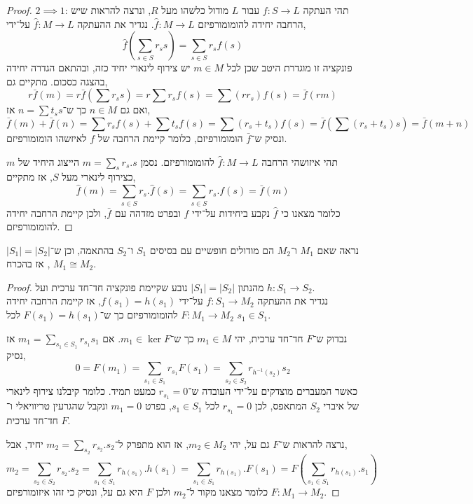 \begin{proof}
	$2 \implies 1$:
	תהי העתקה $f : S \to L$ עבור $L$ מודול כלשהו מעל $R$, ונרצה להראות שיש הרחבה יחידה להומומורפיזם $\hat{f} : M \to L$.
	נגדיר את ההעתקה $\hat{f} : M \to L$ על־ידי,
	\[
		\hat{f}(\sum_{s \in S} r_s s)
		= \sum_{s \in S} r_s f(s)
	\]
	פונקציה זו מוגדרת היטב שכן לכל $m \in M$ יש צירוף לינארי יחיד כזה, ובהתאם הגדרה יחידה בהצגה כסכום.
	מתקיים גם,
	\[
		r \bar{f}(m)
		= r \bar{f}(\sum r_s s)
		= r \sum r_s f(s)
		= \sum (r r_s) f(s)
		= \bar{f}(r m)
	\]
	ואם גם $n \in M$ כך ש־$n = \sum t_s s$ אז,
	\[
		\bar{f}(m) + \bar{f}(n)
		= \sum r_s f(s) + \sum t_s f(s)
		= \sum (r_s + t_s) f(s)
		= \bar{f}(\sum (r_s + t_s) s)
		= \bar{f}(m + n)
	\]
	ונסיק ש־$\bar{f}$ הומומורפיזם, כלומר קיימת הרחבה של $f$ לאיזשהו הומומורפיזם.

	תהי איזושהי הרחבה $\hat{f} : M \to L$ להומומורפיזם.
	נסמן $m = \sum_s r_s . s$ הייצוג היחיד של $m$ כצירוף לינארי מעל $S$, אז מתקיים,
	\[
		\hat{f}(m)
		= \sum_{s \in S} r_s . \hat{f}(s)
		= \sum_{s \in S} r_s . f(s)
		= \bar{f}(m)
	\]
	כלומר מצאנו כי $\hat{f}$ נקבע ביחידות על־ידי $f$ ובפרט מזדהה עם $\bar{f}$, ולכן קיימת הרחבה יחידה להומומורפיזם.
\end{proof}

\subquestion{}
נראה שאם $M_1$ ו־$M_2$ הם מודולים חופשיים עם בסיסים $S_1$ ו־$S_2$ בהתאמה, וכן ש־$|S_1| = |S_2|$, אז בהכרח $M_1 \cong M_2$.
\begin{proof}
	מהנתון $|S_1| = |S_2|$ נובע שקיימת פונקציה חד־חד ערכית ועל $h : S_1 \to S_2$. \\
	נגדיר את ההעתקה $f : S_1 \to M_2$ על־ידי $f(s_1) = h(s_1)$, אז קיימת הרחבה יחידה $F : M_1 \to M_2$ להומומורפיזם כך ש־$F(s_1) = h(s_1)$ לכל $s_1 \in S_1$.

	נבדוק ש־$F$ חד־חד ערכית, יהי $m_1 \in M$ כך ש־$m_1 \in \ker F$.
	אם $m_1 = \sum_{s_1 \in S_1} r_{s_1} s_1$ אז נסיק,
	\[
		0
		= F(m_1)
		= \sum_{s_1 \in S_1} r_{s_1} F(s_1)
		= \sum_{s_2 \in S_2} r_{h^{-1}(s_2)} s_2
	\]
	כאשר המעברים מוצדקים על־ידי העובדה ש־$r_{s_1} = 0$ כמעט תמיד.
	כלומר קיבלנו צירוף לינארי של איברי $S_2$ המתאפס, לכן $r_{s_1} = 0$ לכל $s_1 \in S_1$, בפרט $m_1 = 0$ ונקבל שהגרעין טריוויאלי ו־$F$ חד־חד ערכית.

	נרצה להראות ש־$F$ גם על, יהי $m_2 \in M_2$, אז הוא מתפרק ל־$m_2 = \sum_{s_2} r_{s_2} . s_2$ יחיד, אבל,
	\[
		m_2
		= \sum_{s_2 \in S_2} r_{s_2} . s_2
		= \sum_{s_1 \in S_1} r_{h(s_1)} . h(s_1)
		= \sum_{s_1 \in S_1} r_{h(s_1)} . F(s_1)
		= F\left(\sum_{s_1 \in S_1} r_{h(s_1)} . s_1\right)
	\]
	כלומר מצאנו מקור ל־$m_2$ ולכן $F$ היא גם על, ונסיק כי זהו איזומורפיזם $F : M_1 \to M_2$.
\end{proof}

